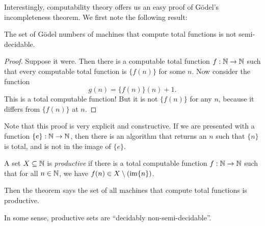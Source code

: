 \documentclass[a4paper]{article}
\newcommand\con{\mathrm{con}}
\begin{document}
%
%
%

Interestingly, computability theory offers us an easy proof of G\"odel's incompleteness theorem. We first note the following result:
\begin{thm}
  The set of G\"odel numbers of machines that compute total functions is not semi-decidable.
\end{thm}

\begin{proof}
  Suppose it were. Then there is a computable total function $f: \mathbb{N} \to \mathbb{N}$ such that every computable total function is $\{f(n)\}$ for some $n$. Now consider the function
  \[
    g(n) = \{f(n)\} (n) + 1.
  \]
  This is a total computable function! But it is not $\{f(n)\}$ for any $n$, because it differs from $\{f(n)\}$ at $n$.
\end{proof}
Note that this proof is very explicit and constructive. If we are presented with a function $\{e\}: \mathbb{N} \to \mathbb{N}$, then there is an algorithm that returns an $n$ such that $\{n\}$ is total, and is not in the image of $\{e\}$.

\begin{defi}
  A set $X \subseteq \mathbb{N}$ is \emph{productive} if there is a total computable function $f: \mathbb{N} \to \mathbb{N}$ such that for all $n \in \mathbb{N}$, we have $f(n) \in X \setminus (\operatorname{im} \{n\})$.
\end{defi}
Then the theorem says the set of all machines that compute total functions is productive.

In some sense, productive sets are ``decidably non-semi-decidable''.
\end{document}
